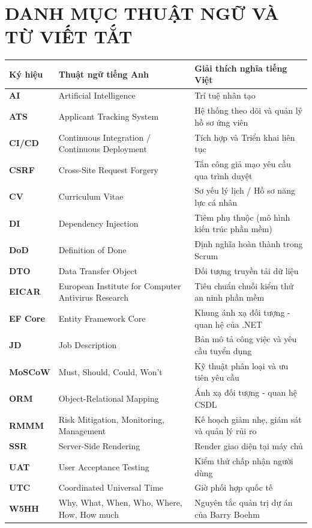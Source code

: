 \documentclass[12pt,a4paper,oneside]{report}
\begin{document}
\chapter*{DANH MỤC THUẬT NGỮ VÀ TỪ VIẾT TẮT}

\begin{table}[htbp]
\centering
\begin{tabularx}{\textwidth}{l p{5cm} X}
\toprule
\textbf{Ký hiệu} & \textbf{Thuật ngữ tiếng Anh} & \textbf{Giải thích nghĩa tiếng Việt} \\
\midrule
\textbf{AI} & Artificial Intelligence & Trí tuệ nhân tạo \\
\textbf{ATS} & Applicant Tracking System & Hệ thống theo dõi và quản lý hồ sơ ứng viên \\
\textbf{CI/CD} & Continuous Integration / Continuous Deployment & Tích hợp và Triển khai liên tục \\
\textbf{CSRF} & Cross-Site Request Forgery & Tấn công giả mạo yêu cầu qua trình duyệt \\
\textbf{CV} & Curriculum Vitae & Sơ yếu lý lịch / Hồ sơ năng lực cá nhân \\
\textbf{DI} & Dependency Injection & Tiêm phụ thuộc (mô hình kiến trúc phần mềm) \\
\textbf{DoD} & Definition of Done & Định nghĩa hoàn thành trong Scrum \\
\textbf{DTO} & Data Transfer Object & Đối tượng truyền tải dữ liệu \\
\textbf{EICAR} & European Institute for Computer Antivirus Research & Tiêu chuẩn chuỗi kiểm thử an ninh phần mềm \\
\textbf{EF Core} & Entity Framework Core & Khung ánh xạ đối tượng - quan hệ của .NET \\
\textbf{JD} & Job Description & Bản mô tả công việc và yêu cầu tuyển dụng \\
\textbf{MoSCoW} & Must, Should, Could, Won't & Kỹ thuật phân loại và ưu tiên yêu cầu \\
\textbf{ORM} & Object-Relational Mapping & Ánh xạ đối tượng - quan hệ CSDL \\
\textbf{RMMM} & Risk Mitigation, Monitoring, Management & Kế hoạch giảm nhẹ, giám sát và quản lý rủi ro \\
\textbf{SSR} & Server-Side Rendering & Render giao diện tại máy chủ \\
\textbf{UAT} & User Acceptance Testing & Kiểm thử chấp nhận người dùng \\
\textbf{UTC} & Coordinated Universal Time & Giờ phối hợp quốc tế \\
\textbf{W5HH} & Why, What, When, Who, Where, How, How much & Nguyên tắc quản trị dự án của Barry Boehm \\
\bottomrule
\end{tabularx}
\end{table}
\end{document}

